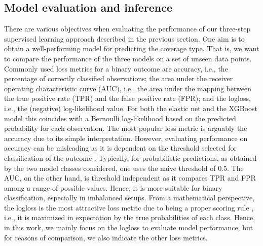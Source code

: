 \documentclass[namedate,webpdf,modern,medium]{oup-authoring-template}
\begin{document}
\subsection{Model evaluation and inference}
\label{sec:model_eval}
There are various objectives when evaluating the performance of our three-step supervised learning approach described in the previous section. One aim is to obtain a well-performing model for predicting the coverage type. That is, we want to compare the performance of the three models on a set of unseen data points. Commonly used loss metrics for a binary outcome are accuracy, i.e., the percentage of correctly classified observations; the area under the receiver operating characteristic curve (AUC), i.e., the area under the mapping between the true positive rate (TPR) and the false positive rate (FPR); %
and the logloss, i.e., the (negative) log-likelihood value. For both the elastic net and the XGBoost model this coincides with a Bernoulli log-likelihood based on the predicted probability for each observation. 
The most popular loss metric is arguably the accuracy due to its simple interpretation. However, evaluating performance on accuracy can be misleading as it is dependent on the threshold selected for classification of the outcome \citep[see, e.g.,][]{tholke23acc}. Typically, for probabilistic predictions, as obtained by the two model classes considered, one uses the naive threshold of $0.5$. The AUC, on the other hand, is threshold independent as it compares TPR and FPR among a range of possible values. Hence, it is more suitable for binary classification, especially in imbalanced setups. From a mathematical perspective, the logloss is the most attractive loss metric due to being a proper scoring rule \citep{waghmare25scoring}, i.e., it is maximized in expectation by the true probabilities of each class. Hence, in this work, we mainly focus on the logloss to evaluate model performance, but for reasons of comparison, we also indicate the other loss metrics. 
\end{document}
